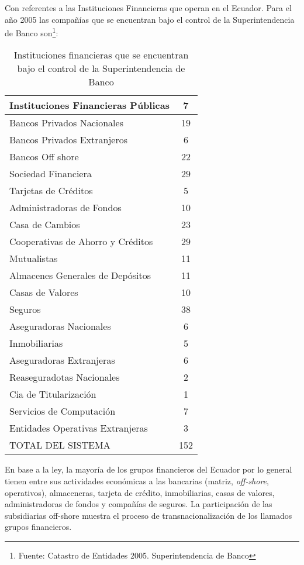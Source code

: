 Con referentes a las Instituciones Financieras que operan en el Ecuador. Para el año 2005 las compañías que se encuentran bajo el control de la Superintendencia de Banco son\footnote{Fuente: Catastro de Entidades 2005. Superintendencia de Banco}: 

\begin{table}[h!]
\centering
\begin{tabularx}{9cm}{|X|c|} \hline
Instituciones Financieras Públicas	&  7 \\ \hline
Bancos Privados Nacionales 		& 19 \\ \hline
Bancos Privados Extranjeros 		&  6 \\ \hline
Bancos Off shore			& 22 \\ \hline
Sociedad Financiera 			& 29 \\ \hline
Tarjetas de Créditos  			&  5 \\ \hline
Administradoras de Fondos		& 10 \\ \hline
Casa de Cambios				& 23 \\ \hline
Cooperativas de Ahorro y Créditos	& 29 \\ \hline
Mutualistas				& 11 \\ \hline
Almacenes Generales de Depósitos	& 11 \\ \hline
Casas de Valores			& 10 \\ \hline
Seguros					& 38 \\ \hline
Aseguradoras Nacionales			&  6 \\ \hline
Inmobiliarias 				&  5 \\ \hline
Aseguradoras Extranjeras		&  6 \\ \hline
Reaseguradotas Nacionales 		&  2 \\ \hline
Cia de Titularización 			&  1 \\ \hline
Servicios de Computación 		&  7 \\ \hline
Entidades Operativas Extranjeras	&  3 \\ \hline
TOTAL DEL SISTEMA 			&152 \\ \hline
\end{tabularx}
\caption{Instituciones financieras que se encuentran bajo el control de la Superintendencia de Banco}
\end{table}

En base a la ley, la mayoría de los grupos financieros del Ecuador por lo general tienen entre sus actividades económicas  a las bancarias (matriz, \textit{off-shore}, operativos), almaceneras, tarjeta de crédito, inmobiliarias, casas de valores, administradoras de fondos y compañías de seguros. La participación de las subsidiarias off-shore  muestra el proceso de transnacionalización de los llamados grupos financieros.

